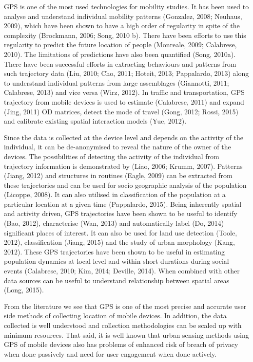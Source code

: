  GPS is one of the most used technologies for mobility studies. It has been used to analyse and understand individual mobility patterns (Gonzalez, 2008; Neuhaus, 2009), which have been shown to have a high order of regularity in spite of the complexity (Brockmann, 2006; Song, 2010 b). There have been efforts to use this regularity to predict the future location of people (Monreale, 2009; Calabrese, 2010). The limitations of predictions have also been quantified (Song, 2010a). There have been successful efforts in extracting behaviours and patterns from such trajectory data (Liu, 2010; Cho, 2011; Hoteit, 2013; Pappalardo, 2013) along to understand individual patterns from large assemblages (Giannotti, 2011; Calabrese, 2013) and vice versa (Wirz, 2012). In traffic and transportation, GPS trajectory from mobile devices is used to estimate (Calabrese, 2011) and expand (Jing, 2011) OD matrices, detect the mode of travel (Gong, 2012; Rossi, 2015) and calibrate existing spatial interaction models (Yue, 2012). 

 Since the data is collected at the device level and depends on the activity of the individual, it can be de-anonymised to reveal the nature of the owner of the devices. The possibilities of detecting the activity of the individual from trajectory information is demonstrated by (Liao, 2006; Krumm, 2007). Patterns (Jiang, 2012) and structures in routines (Eagle, 2009) can be extracted from these trajectories and can be used for socio geographic analysis of the population (Licoppe, 2008). It can also utilised in classification of the population at a particular location at a given time (Pappalardo, 2015). Being inherently spatial and activity driven, GPS trajectories have been shown to be useful to identify (Bao, 2012), characterise (Wan, 2013) and automatically label (Do, 2014) significant places of interest. It can also be used for land use detection (Toole, 2012), classification (Jiang, 2015) and the study of urban morphology (Kang, 2012). These GPS trajectories have been shown to be useful in estimating population dynamics at local level and within short durations during social events (Calabrese, 2010; Kim, 2014; Deville, 2014). When combined with other data sources can be useful to understand relationship between spatial areas (Long, 2015).

 From the literature we see that GPS is one of the most precise and accurate user side methods of collecting location of mobile devices. In addition, the data collected is well understood and collection methodologies can be scaled up with minimum resources. That said, it is well known that urban sensing methods using GPS of mobile devices also has problems of enhanced risk of breach of privacy when done passively and need for user engagement when done actively.

